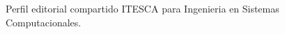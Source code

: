 \documentclass[spanish]{article}
\begin{document}
Perfil editorial compartido ITESCA para Ingenieria en Sistemas Computacionales.
\end{document}
